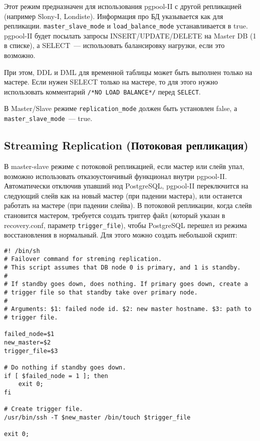 Этот режим предназначен для использования pgpool-II с другой репликацией (например Slony-I, Londiste). Информация про БД указывается как для репликации. \lstinline!master_slave_mode! и \lstinline!load_balance_mode! устанавливается в true. pgpool-II будет посылать запросы INSERT/UPDATE/DELETE на Master DB (1 в списке), а SELECT~--- использовать балансировку нагрузки, если это возможно.

При этом, DDL и DML для временной таблицы может быть выполнен только на мастере. Если нужен SELECT только на мастере, то для этого нужно использовать комментарий \lstinline!/*NO LOAD BALANCE*/! перед \lstinline!SELECT!.

В Master/Slave режиме \lstinline!replication_mode! должен быть установлен false, а \lstinline!master_slave_mode!~--- true.

\subsection{Streaming Replication (Потоковая репликация)}

В master-slave режиме с потоковой репликацией, если мастер или слейв упал, возможно использовать отказоустоичивый функционал внутри pgpool-II. Автоматически отключив упавший нод PostgreSQL, pgpool-II переключится на следующий слейв как на новый мастер (при падении мастера), или останется работать на мастере (при падении слейва). В потоковой репликации, когда слейв становится мастером, требуется создать триггер файл (который указан в recovery.conf, параметр \lstinline!trigger_file!), чтобы PostgreSQL перешел из режима
восстановления в нормальный. Для этого можно создать небольшой скрипт:

\begin{lstlisting}[label=lst:pgpool40,caption=Скрипт выполняется при падении нода PostgreSQL]
#! /bin/sh
# Failover command for streming replication.
# This script assumes that DB node 0 is primary, and 1 is standby.
#
# If standby goes down, does nothing. If primary goes down, create a
# trigger file so that standby take over primary node.
#
# Arguments: $1: failed node id. $2: new master hostname. $3: path to
# trigger file.

failed_node=$1
new_master=$2
trigger_file=$3

# Do nothing if standby goes down.
if [ $failed_node = 1 ]; then
	exit 0;
fi

# Create trigger file.
/usr/bin/ssh -T $new_master /bin/touch $trigger_file

exit 0;
\end{lstlisting}


